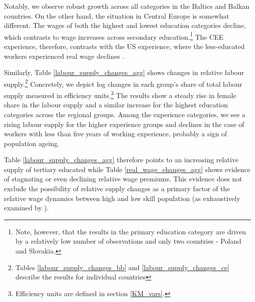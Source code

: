 \documentclass[11pt]{article}
\begin{document}
Notably, we observe robust growth across all categories in the Baltics and Balkan countries. On the other hand, the situation in Central Europe is somewhat different. The wages of both the highest and lowest education categories decline, which contrasts to wage increases across secondary education.\footnote{Note, however, that the results in the primary education category are driven by a relatively low number of observations and only two countries - Poland and Slovakia.} The CEE experience, therefore, contrasts with the US experience, where the less-educated workers experienced real wage declines \citep{acemoglu2011skills}.

Similarly, Table \ref{labour_supply_changes_agg} shows changes in relative labour supply.\footnote{Tables \ref{labour_supply_changes_bb} and \ref{labour_supply_changes_ce} describe the results for individual countries} Concretely, we depict log changes in each group's share of total labour supply measured in efficiency units.\footnote{Efficiency units are defined in section \ref{KM_vars}.} The results show a steady rise in female share in the labour supply and a similar increase for the highest education categories across the regional groups. Among the experience categories, we see a rising labour supply for the higher experience groups and declines in the case of workers with less than five years of working experience, probably a sign of population ageing.

Table \ref{labour_supply_changes_agg} therefore points to an increasing relative supply of tertiary educated while Table \ref{real_wage_changes_agg} shows evidence of stagnating or even declining relative wage premiums. This evidence does not exclude the possibility of relative supply changes as a primary factor of the relative wage dynamics between high and low skill population (as exhaustively examined by \citet{katz1992changes}).
\end{document}
